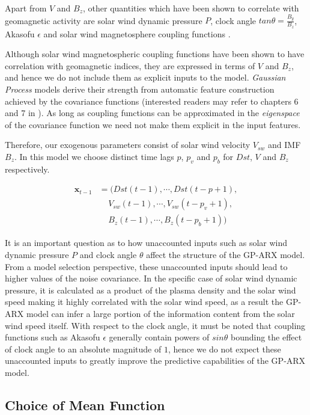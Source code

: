 Apart from $V$ and $B_z$, other quantities which have been shown to correlate with geomagnetic activity are solar wind dynamic pressure $P$, clock angle $tan \theta = \frac{B_y}{B_z}$, Akasofu $\epsilon$ \cite{1986AkasofuE} and solar wind magnetosphere coupling functions \cite{JGRA:JGRA21451}. 

Although solar wind magnetospheric coupling functions have been shown to have correlation with geomagnetic indices, they are expressed in terms of $V$ and $B_z$, and hence we do not include them as explicit inputs to the model. \emph{Gaussian Process} models derive their strength from automatic feature construction achieved by the covariance functions (interested readers may refer to chapters 6 and 7  in \cite{Rasmussen:2005:GPM:1162254}). As long as coupling functions can be approximated in the \emph{eigenspace} of the covariance function we need not make them explicit in the input features. 

Therefore, our exogenous parameters consist of solar wind velocity $V_{sw}$ and IMF $B_z$. In this model we choose distinct time lags $p$, $p_{v}$ and $p_{b}$ for $Dst$, $V$ and $B_z$ respectively.
    
\begin{align*}
       \mathbf{x}_{t-1} & = (Dst(t-1), \cdots , Dst(t-p+1), \\
        & \ \ \ \ \  V_{sw}(t-1), \cdots, V_{sw}(t-p_{v}+1),\\
        & \ \ \ \ \  B_{z}(t-1), \cdots, B_{z}(t-p_{b}+1))
\end{align*}

It is an important question as to how unaccounted inputs such as solar wind dynamic pressure $P$ and clock angle $\theta$ affect the structure of the GP-ARX model. From a model selection perspective, these unaccounted inputs should lead to higher values of the noise covariance. In the specific case of solar wind dynamic pressure, it is calculated as a product of the plasma density and the solar wind speed making it highly correlated with the solar wind speed, as a result the GP-ARX model can infer a large portion of the information content from the solar wind speed itself. With respect to the clock angle, it must be noted that coupling functions such as Akasofu $\epsilon$ generally contain powers of $sin \theta$ bounding the effect of clock angle to an absolute magnitude of $1$, hence we do not expect these unaccounted inputs to greatly improve the predictive capabilities of the GP-ARX model.

\subsection{Choice of Mean Function}

